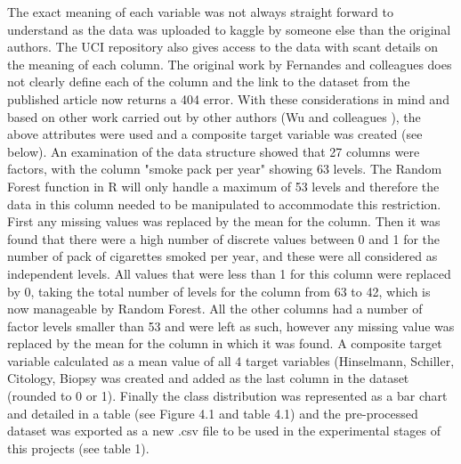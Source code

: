 The exact meaning of each variable was not always straight forward to understand as the data was uploaded to kaggle by someone else than the original authors. The UCI repository also gives access to the data with scant details on the meaning of each column. The original work by Fernandes and colleagues \cite{Fernandes:2017td} does not clearly define each of the column and the link to the dataset from the published article now returns a 404 error. With these considerations in mind and based on other work carried out by other authors (Wu and colleagues \citep{Wu:2017fa}), the above attributes were used and a composite target variable was created (see below).\newline
An examination of the data structure showed that 27 columns were factors, with the column "smoke pack per year" showing 63 levels. The Random Forest function in R will only handle a maximum of 53 levels and therefore the data in this column needed to be manipulated to accommodate this restriction. First any missing values was replaced by the mean for the column. Then it was found that there were a high number of discrete values between 0 and 1 for the number of pack of cigarettes smoked per year, and these were all considered as independent levels. All values that were less than 1 for this column were replaced by 0, taking the total number of levels for the column from 63 to 42, which is now manageable by Random Forest.
All the other columns had a number of factor levels smaller than 53 and were left as such, however any missing value was replaced by the mean for the column in which it was found.
A composite target variable calculated as a mean value of all 4 target variables (Hinselmann, Schiller, Citology, Biopsy was created and added as the last column in the dataset (rounded to 0 or 1).
Finally the class distribution was represented as a bar chart and detailed in a table (see Figure 4.1 and table 4.1) and the pre-processed dataset was exported as a new .csv file to be used in the experimental stages of this projects (see table 1).

